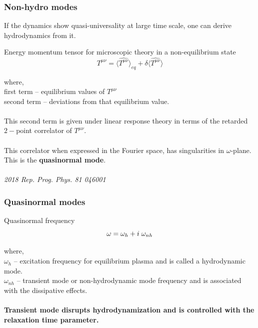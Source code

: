 \documentclass[aspectratio=1610]{beamer}
\begin{document}


\begin{frame}
\frametitle{Non-hydro modes}

If the dynamics show quasi-universality at large time scale, one can derive hydrodynamics from it.


\begin{block}{Energy momentum tensor for microscopic theory in a non-equilibrium state}
\begin{equation}
T^{\mu\nu} =  \langle \hat{T^{\mu\nu}} \rangle_{eq} + \delta \langle \hat{ T^{\mu\nu}} \rangle
\end{equation}
\end{block}

where,\\
\hspace*{10mm}  first term -- equilibrium values of $T^{\mu\nu}$ \\
\hspace*{10mm}  second term -- deviations from that equilibrium value. \\~\\

This second term is given under linear response theory in terms of the retarded $2-$point correlator of $T^{\mu\nu}$. \\~\\

This correlator when expressed in the Fourier space, has singularities in $\omega$-plane. This is the \textbf{quasinormal mode}.\\~\\

\textit{2018 Rep. Prog. Phys. 81 046001}

\end{frame}


\begin{frame}
\frametitle{Quasinormal modes}
\begin{block}{Quasinormal frequency}
\begin{equation}
{\LARGE \omega = \omega_h + i \; \omega_{nh} }
\end{equation}
\end{block}
where, \\

\hspace*{10mm}	$\omega_h$ -- excitation frequency for equilibrium plasma and is called a hydrodynamic mode. \\

\hspace*{10mm}	$\omega_{nh}$ -- transient mode or non-hydrodynamic mode frequency and is associated with the dissipative effects.  \\~\\

{\Large \textbf{Transient mode disrupts  hydrodynamization and is controlled with the relaxation time parameter.}}
\end{frame}
\end{document}
